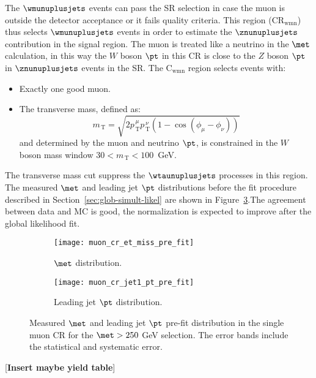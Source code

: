 The $\wmunuplusjets$ events can pass the SR selection in case the muon is
outside the detector acceptance or it fails quality criteria. This region
(CR$_\mathrm{wmn}$) thus selects $\wmunuplusjets$ events in order to estimate
the $\znunuplusjets$ contribution in the signal region. The muon is treated like
a neutrino in the $\met$ calculation, in this way the $W$ boson $\pt$ in this CR
is close to the $Z$ boson $\pt$ in $\znunuplusjets$ events in the SR\@. The
C$_{\mathrm{wmn}}$ region selects events with:
\begin{itemize}
\item Exactly one good muon.
\item The transverse mass, defined as:
  \begin{equation}
    \label{eq:82}
    m_\mathrm{\, T} = \sqrt{2 p_\mathrm{\, T}^{\, \mu} p_\mathrm{\, T}^{\, \nu}
      (1 - \cos(\phi_\mu - \phi_\nu))}
  \end{equation}
  and determined by the muon and neutrino $\pt$, is constrained in the
  $W$ boson mass window $30 < m_\mathrm{\, T} < 100$~GeV.
\end{itemize}
The transverse mass cut suppress the $\wtaunuplusjets$ processes in this
region. The measured $\met$ and leading jet $\pt$ distributions before the fit
procedure described in Section~\ref{sec:glob-simult-likel} are shown in
Figure~\ref{fig:muon_cr_plots}.The agreement between data and MC is good, the
normalization is expected to improve after the global likelihood fit.

\begin{figure}[!h]
  \centering
  \begin{subfigure}[t]{.48\linewidth}
    \texttt{[image: muon\_cr\_et\_miss\_pre\_fit]}
    \caption{$\met$ distribution.}
    \label{fig:muon_cr_et_miss_pre_fit}
  \end{subfigure}
  \begin{subfigure}[t]{.48\linewidth}
    \texttt{[image: muon\_cr\_jet1\_pt\_pre\_fit]}
    \caption{Leading jet $\pt$ distribution.}
    \label{fig:muon_cr_jet1_pt_pre_fit}
  \end{subfigure}
  \caption{Measured $\met$ and leading jet $\pt$ pre-fit distribution in the
    single muon CR for the $\met > 250~$GeV selection. The error bands include
    the statistical and systematic error.}
  \label{fig:muon_cr_plots}
\end{figure}

\mbox{}

[\textbf{Insert maybe yield table}]
